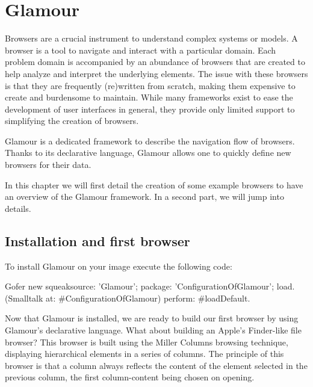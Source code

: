 \documentclass[a4paper,10pt,twoside]{book}
\begin{document}
\fi
\sloppy
\chapter{Glamour}

Browsers are a crucial instrument to understand complex systems or
models. A browser is a tool to navigate and interact with a particular domain.
Each problem domain is accompanied by an abundance of browsers
that are created to help analyze and interpret the underlying
elements. The issue with these browsers is that they are frequently
(re)written from scratch, making them expensive to create and burdensome
to maintain. While many frameworks exist to ease the development of
user interfaces in general, they provide only limited support to
simplifying the creation of browsers.

Glamour is a dedicated framework to describe the navigation flow
of browsers. Thanks to its declarative language, Glamour allows one to
quickly define new browsers for their data.

In this chapter we will first detail the creation of some example
browsers to have an overview of the Glamour framework. In a second
part, we will jump into details.

\section{Installation and first browser}
\label{sec:inst-first-brows}

To install Glamour on your \pharo{} image execute the following code:

\begin{code}{}
Gofer new
  squeaksource: 'Glamour'; 
  package: 'ConfigurationOfGlamour';
  load.
(Smalltalk at: #ConfigurationOfGlamour) perform: #loadDefault.
\end{code}

Now that Glamour is installed, we are ready to build our first browser by using Glamour's declarative language. 
What about building an Apple's Finder-like file browser? This browser is built
using the Miller Columns browsing technique, displaying hierarchical
elements in a series of columns. The principle of this browser is
that a column always reflects the content of the element selected in
the previous column, the first column-content being chosen on opening.
\end{document}

